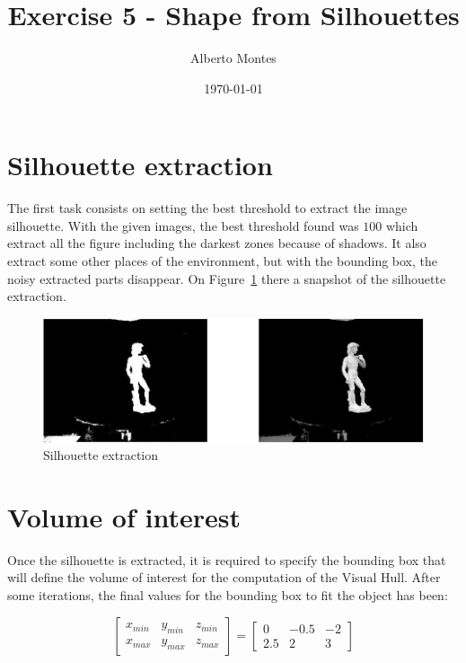 \documentclass{ethz_report}
\title{Exercise 5 - Shape from Silhouettes}
\author{Alberto Montes}
\date{\today}
\begin{document}
\maketitle

\section*{Silhouette extraction}

The first task consists on setting the best threshold to extract the image silhouette. With the given images, the best threshold found was $100$ which extract all the figure including the darkest zones because of shadows. It also extract some other places of the environment, but with the bounding box, the noisy extracted parts disappear. On Figure~\ref{fig:silhouette_extraction} there a snapshot of the silhouette extraction.

\begin{figure}[H]
    \centering
    \includegraphics[width=1\linewidth]{images/silhouette_extraction}
    \caption{Silhouette extraction}
    \label{fig:silhouette_extraction}
\end{figure}

\section*{Volume of interest}

Once the silhouette is extracted, it is required to specify the bounding box that will define the volume of interest for the computation of the Visual Hull.
After some iterations, the final values for the bounding box to fit the object has been:

\begin{equation}
    \begin{bmatrix}
        x_{min} & y_{min} & z_{min} \\
        x_{max} & y_{max} & z_{max}
    \end{bmatrix}
    =
    \begin{bmatrix}
        0 & -0.5 & -2 \\
        2.5 & 2 & 3
    \end{bmatrix}
\end{equation}
\end{document}
